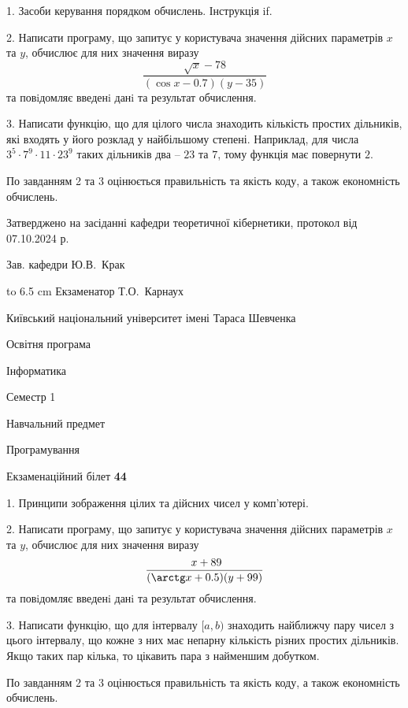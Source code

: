 \documentclass[12pt, ukrainian]{article}
\begin{document}
{%
1. Засоби керування порядком обчислень. Інструкція if.%
\par
2. Написати програму, що запитує у користувача значення дійсних параметрів $x$ та $y$, обчислює для них значення виразу 
$$\frac{\sqrt x - 78}{(\cos x - 0.7) (y - 35)}$$ 
та повiдомляє введенi данi та результат обчислення.

\par
3. Написати функцію, що для цілого числа знаходить кількість простих дільників, які входять у його розклад у найбільшому степені. Наприклад, для числа $3^5{\cdot}7^9{\cdot}11{\cdot}23^{9}$ таких дільників два – $23$ та $7$, тому функція має повернути $2$.

По завданням 2 та 3 оцінюється правильність та якість коду, а також економність обчислень.

}
{\smallskip\smallskip \begin {scriptsize} Затверджено на засіданні кафедри теоретичної кібернетики, протокол   від   07.10.2024 р.\par\smallskip\smallskip\smallskip\smallskip
{\parbox {6.5 cm} {Зав. кафедри \dotfill Ю.В.~Крак}}\hspace {0.7cm} {\hbox to 6.5 cm { Екзаменатор \dotfill Т.О.~Карнаух}} \end{scriptsize}}
\vspace{0.9cm}
{{\begin {scriptsize}\par
{ \center  Київський національний університет імені Тараса Шевченка \par}
{\parbox {5 cm}{Освітня програма \hfill}{\parbox {7 cm}{Інформатика\hfill}}\parbox {6 cm}{\hfill Семестр 1}}\par
{\parbox {5 cm} {Навчальний предмет \hfill}\parbox {7 cm}{Програмування \hfill}\parbox {6cm}{\hfill}\par}\vspace{-15pt} \end{scriptsize}}{\center Екзаменаційний білет \No \textbf { 44 }\par}}
{%
1. Принципи зображення цілих та дійсних чисел у комп'ютері.%
\par
2. Написати програму, що запитує у користувача значення дійсних параметрів $x$ та $y$, обчислює для них значення виразу 
$$\frac{\ x + 89}{(\arctg x + 0.5) (y + 99)}$$ 
та повiдомляє введенi данi та результат обчислення.

\par
3. Написати функцію, що для інтервалу $[a, b)$ знаходить найближчу пару чисел з цього інтервалу, що кожне з них має непарну кількість різних простих дільників. Якщо таких пар кілька, то цікавить пара з найменшим добутком.

По завданням 2 та 3 оцінюється правильність та якість коду, а також економність обчислень.

}
\end{document}
